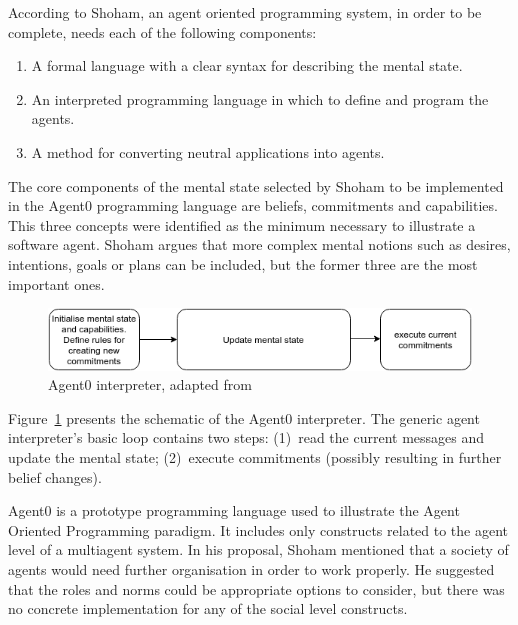 \documentclass[a4paper,12pt,oneside,fleqn]{book} %
\begin{document}
According to Shoham, an agent oriented programming system, in order to be
complete, needs each of the following components:
\begin{enumerate}
   \item A formal language with a clear syntax for describing the mental state.
   \item An interpreted programming language in which to define and program the agents.
   \item A method for converting neutral applications into agents.
\end{enumerate}

The core components of the mental state selected by Shoham to be
implemented in the Agent0 programming language are beliefs, commitments and
capabilities. This three concepts were identified as the minimum necessary
to illustrate a software agent. Shoham argues that more complex mental
notions such as desires, intentions, goals or plans can be included, but
the former three are the most important ones.

\begin{figure}\footnotesize %
\includegraphics{Agent0Interp.png}
\caption{Agent0 interpreter, adapted from~\cite{DBLP:journals/ai/Shoham93}}
\label{fig:Agent0Interp}
\end{figure} %

Figure~\ref{fig:Agent0Interp} presents the schematic of the Agent0
interpreter. The generic agent interpreter's basic loop contains two steps:
(1)~read the current messages and update the mental state; (2)~execute
commitments (possibly resulting in further belief changes).

Agent0 is a prototype programming language used to illustrate the Agent
Oriented Programming paradigm. It includes only constructs related to the
agent level of a multiagent system. In his proposal, Shoham mentioned that
a society of agents would need further organisation in order to work
properly. He suggested that the roles and norms could be appropriate
options to consider, but there was no concrete implementation for any of
the social level constructs.
\end{document}
